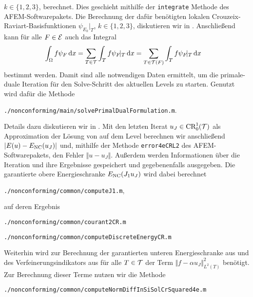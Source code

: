 $k\in\{1,2,3\}$, berechnet. 
Dies geschieht mithilfe der \texttt{integrate} Methode \cite[Abschnitt
1.8.2]{CGKNRR10} des AFEM-Softwarepakets.
Die Berechnung der dafür benötigten lokalen Crouzeix-Raviart-Basisfunktionen
$\psi_{E_k}\!|_T$, $k\in\{1,2,3\}$, diskutieren wir in
.
Anschließend kann für alle $F\in\mathcal{E}$ auch das Integral 
\begin{align*}
  \int_\Omega f\psi_F\,\mathrm{d}x
  &=
  \sum_{T\in\mathcal{T}}\int_T f\psi_F\!|_T\,\mathrm{d}x
  =
  \sum_{T\in\mathcal{T}(F)}\int_T f\psi_F\!|_T\,\mathrm{d}x
\end{align*}
bestimmt werden.
Damit sind alle notwendigen Daten ermittelt, um die primale-duale Iteration für
den Solve-Schritt des aktuellen Levels zu starten. 
Genutzt wird dafür die Methode
\begin{center}
  \texttt{./nonconforming/main/solvePrimalDualFormulation.m}.
\end{center}
Details dazu diskutieren wir in .
Mit den letzten Iterat $u_J\in\textup{CR}^1_0(\mathcal{T})$ als Approximation der Lösung von
 auf dem Level berechnen wir anschließend
$|E(u)-E_\textup{NC}(u_J)|$ und, mithilfe der Methode \texttt{error4eCRL2}
\cite[Abschnitt 1.8.3]{CGKNRR10} des AFEM-Soft\-ware\-pakets, den
Fehler $\Vert u - u_J\Vert$.
Außerdem werden Informationen über die Iteration und ihre Ergebnisse
gespeichert und gegebenenfalls ausgegeben. 
Die garantierte obere Energieschranke $E_\textup{NC}(J_1 u_J)$ wird dabei berechnet 
\begin{center}
    \texttt{./nonconforming/common/computeJ1.m},
\end{center}
auf deren Ergebnis
\begin{center}
    \texttt{./nonconforming/common/courant2CR.m} 
\end{center}
\begin{center}
    \texttt{./nonconforming/common/computeDiscreteEnergyCR.m} 
\end{center}
Weiterhin wird zur Berechnung der garantierten unteren Energieschranke 
aus  und des Verfeinerungsindikators aus
 für alle $T\in\mathcal{T}$ der Term $\Vert f-\alpha
u_J\Vert_{L^2(T)}^2$ benötigt.
Zur Berechnung dieser Terme nutzen wir die Methode
\begin{center}
  \texttt{./nonconforming/common/computeNormDiffInSiSolCrSquared4e.m}
\end{center}
